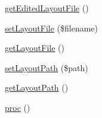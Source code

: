 \begin{DoxyCompactItemize}
\item 
\hyperlink{classModuleObject_a14fc83257a1518a1753c50cb11289c27}{get\+Edited\+Layout\+File} ()
\item 
\hyperlink{classModuleObject_aab99465b1bac81df148c829a3b14f933}{set\+Layout\+File} (\$filename)
\item 
\hyperlink{classModuleObject_af446ac0f9c2a19c2629f30afd6271ec6}{get\+Layout\+File} ()
\item 
\hyperlink{classModuleObject_a15410a43eadf4aa49e4fed4b26cd1f25}{set\+Layout\+Path} (\$path)
\item 
\hyperlink{classModuleObject_aab8f7fe782fee9313b1a84f5a3afd2dd}{get\+Layout\+Path} ()
\item 
\hyperlink{classModuleObject_a621ea29505c6ccd4444a06bc1c8554a5}{proc} ()
\end{DoxyCompactItemize}
